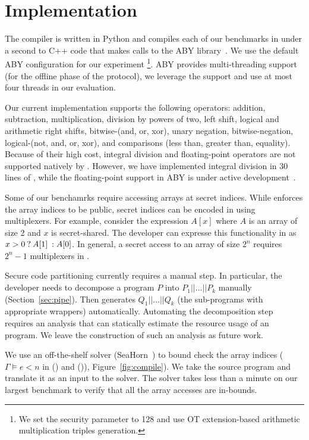 \section{Implementation}
\label{sec:impl}
The  \tool compiler is written in Python and
compiles each of our benchmarks in under a second to C++ code that
makes calls to the ABY
library~\cite{aby}. We use the default ABY configuration for our
experiment \footnote{We set the security parameter to 128 and use OT
extension-based arithmetic multiplication triples generation.}. ABY
provides multi-threading support (for the offline phase of the
protocol), we leverage the support and use at most four threads in our
evaluation.

Our current implementation supports the following operators:
addition, subtraction, multiplication, division by powers of two, left
shift,
logical and arithmetic right shifts, bitwise-(and, or, xor), unary
negation, 
bitwise-negation, logical-(not, and, or, xor), and comparisons (less
than, greater than, equality). 
Because of their high cost, integral division and floating-point
operators are not supported natively by \tool. 
However, we have implemented integral division in 30 lines of \tool,
while the floating-point support in ABY is under active
development~\cite{ddkssz15}.


Some of our benchamrks require accessing arrays at secret
indices. While \tool enforces the array indices to be
public, secret indices can be encoded in \tool using multiplexers.
For example, consider the expression $A[x]$ where $A$ is an array of
size 2 and $x$ is secret-shared. The developer can expresse
this functionality in \tool as ${{x > 0}\:?\:{A[1]}\::{A[0]}}$. In general,
a secret access to an array of
size $2^n$ requires $2^{n}-1$ multiplexers in \tool.

 Secure code partitioning currently requires a manual step.
In particular, the developer needs to decompose a program $P$ into
$P_1||\ldots||P_k$ manually (Section~\ref{sec:pipe}). Then \tool
generates $Q_1||\ldots||Q_k$ (the sub-programs with appropriate
wrappers) automatically.
Automating the decomposition step requires an analysis that can 
statically estimate the resource usage of an \tool program. We leave
the construction of such an analysis as future work.

We use an off-the-shelf solver
(SeaHorn~\cite{seahorn}) to bound check the array indices
($\Gamma\vDash e < n$
in ({}) and ({})),
Figure~\ref{fig:compile}). We take the \tool source program and
translate it as an input to the solver. The solver takes less
than a minute on our largest benchmark to verify that all the array
accesses are in-bounds.

